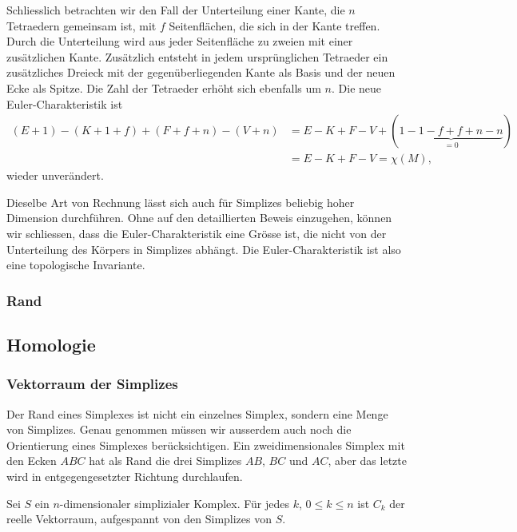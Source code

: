 Schliesslich betrachten wir den Fall der Unterteilung einer Kante,
die $n$ Tetraedern gemeinsam ist, mit $f$ Seitenflächen, die sich
in der Kante treffen.
Durch die Unterteilung wird aus jeder Seitenfläche zu zweien
mit einer zusätzlichen Kante.
Zusätzlich entsteht in jedem ursprünglichen Tetraeder ein zusätzliches
Dreieck mit der gegenüberliegenden Kante als Basis und der neuen
Ecke als Spitze.
Die Zahl der Tetraeder erhöht sich ebenfalls um $n$.
Die neue Euler-Charakteristik ist
\begin{align*}
(E+1)
-
(K+1+f)
+
(F+f+n)
-
(V+n)
&=
E-K+F-V + (\underbrace{1-1-f+f+n-n}_{\displaystyle=0})
\\
&=
E-K+F-V
=
\chi(M),
\end{align*}
wieder unverändert.

Dieselbe Art von Rechnung lässt sich auch für Simplizes beliebig hoher
Dimension durchführen.
Ohne auf den detaillierten Beweis einzugehen, können wir schliessen,
dass die Euler-Charakteristik eine Grösse ist, die nicht von der Unterteilung
des Körpers in Simplizes abhängt.
Die Euler-Charakteristik ist also eine topologische Invariante.

%
%
\subsubsection{Rand}


%
%
\subsection{Homologie
\label{buch:topologie:subsection:homologie}}

\subsubsection{Vektorraum der Simplizes}
Der Rand eines Simplexes ist nicht ein einzelnes Simplex, sondern
eine Menge von Simplizes.
Genau genommen müssen wir ausserdem auch noch die Orientierung eines
Simplexes berücksichtigen.
Ein zweidimensionales Simplex mit den Ecken $ABC$ hat als Rand
die drei Simplizes $AB$, $BC$ und $AC$, aber das letzte wird in
entgegengesetzter Richtung durchlaufen.

\begin{definition}
Sei $S$ ein $n$-dimensionaler simplizialer Komplex.
Für jedes $k$, $0\le k\le n$ ist $C_k$ der reelle Vektorraum, aufgespannt
von den Simplizes von $S$.
\end{definition}



